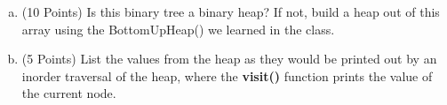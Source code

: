 \documentclass{article}
\begin{document}
\begin{enumerate}
\begin{enumerate}[(a)]
\item (10 Points) Is this binary tree a binary heap? If not, build a heap
out of this array using the BottomUpHeap() we learned in the class. 


\item (5 Points) {\Large List the values from the heap as they would be printed
out by an inorder traversal of the heap, where the \textbf{visit()} function
prints the value of the current node.} \\


\end{enumerate}
\end{enumerate}                 %
\end{document}
